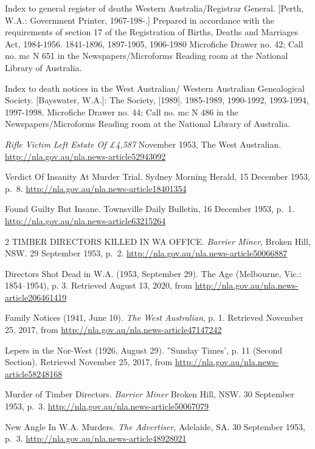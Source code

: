 \begin{thebibliography}{999}
	Index to general register of deaths Western Australia/Registrar General. [Perth, W.A.: Government Printer, 1967-198-.] Prepared in accordance with the requirements of section 17 of the Registration of Births, Deaths and Marriages Act, 1984-1956. 1841-1896, 1897-1905, 1906-1980 Microfiche Drawer no. 42; Call no. mc N 651 in the Newspapers/Microforms Reading room at the National Library of Australia.

	Index to death notices in the West Australian/ Western Australian Genealogical Society. [Bayswater, W.A.]: The Society, [1989]. 1985-1989, 1990-1992, 1993-1994, 1997-1998. Microfiche Drawer no. 44; Call no. mc N 486 in the Newspapers/Microforms Reading room at the National Library of Australia.

	\emph{Rifle Victim Left Estate Of \pounds 4,587} November 1953, The West Australian.
	\url{http://nla.gov.au/nla.news-article52943092}

	Verdict Of Insanity At Murder Trial. Sydney Morning Herald, 15 December 1953, p.\ 8.
	\url{http://nla.gov.au/nla.news-article18401354}

	Found Guilty But Insane. Townsville Daily Bulletin, 16 December 1953, p.\ 1.
	\url{http://nla.gov.au/nla.news-article63215264}

	 2 TIMBER DIRECTORS KILLED IN WA OFFICE. \emph{Barrier Miner}, Broken Hill, NSW. 29 September 1953, p.\ 2.
	 \url{http://nla.gov.au/nla.news-article50066887}

	Directors Shot Dead in W.A. (1953, September 29). The Age (Melbourne, Vic.: 1854--1954), p. 3.
	Retrieved August 13, 2020, from \url{http://nla.gov.au/nla.news-article206461419}

	Family Notices (1941, June 10). \emph{The West Australian}, p. 1.
	Retrieved November 25, 2017, from \url{http://nla.gov.au/nla.news-article47147242}

	Lepers in the Nor-West (1926, August 29). ''Sunday Times', p. 11 (Second Section).
	Retrieved November 25, 2017, from \url{http://nla.gov.au/nla.news-article58248168}

	Murder of Timber Directors. \emph{Barrier Miner} Broken Hill, NSW. 30 September 1953, p.\ 3.
	\url{http://nla.gov.au/nla.news-article50067079}

	New Angle In W.A. Murders. \emph{The Advertiser}, Adelaide, SA. 30 September 1953, p.\ 3.
	\url{http://nla.gov.au/nla.news-article48928021}


\end{thebibliography}
